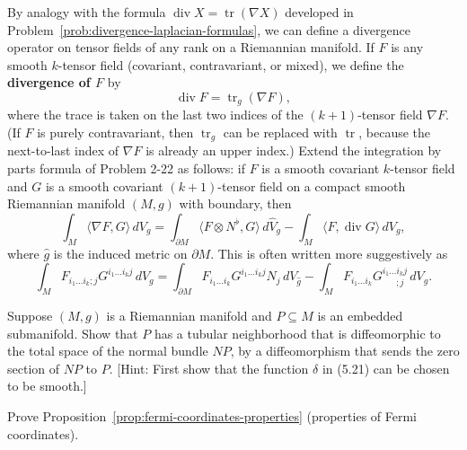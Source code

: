 \begin{exercise}
\label{prob:divergence-tensor-fields}

By analogy with the formula $\operatorname{div} X = \operatorname{tr}(\nabla X)$ developed in Problem~\ref{prob:divergence-laplacian-formulas}, we can define a divergence operator on tensor fields of any rank on a Riemannian manifold. If $F$ is any smooth $k$-tensor field (covariant, contravariant, or mixed), we define the \textbf{divergence of $F$} by
\[
\operatorname{div} F = \operatorname{tr}_g(\nabla F),
\]
where the trace is taken on the last two indices of the $(k+1)$-tensor field $\nabla F$. (If $F$ is purely contravariant, then $\operatorname{tr}_g$ can be replaced with $\operatorname{tr}$, because the next-to-last index of $\nabla F$ is already an upper index.) Extend the integration by parts formula of Problem 2-22 as follows: if $F$ is a smooth covariant $k$-tensor field and $G$ is a smooth covariant $(k+1)$-tensor field on a compact smooth Riemannian manifold $(M,g)$ with boundary, then
\[
\int_M \langle \nabla F, G \rangle \, dV_g = \int_{\partial M} \langle F \otimes N^\flat, G \rangle \, d\hat{V}_g - \int_M \langle F, \operatorname{div} G \rangle \, dV_g,
\]
where $\hat{g}$ is the induced metric on $\partial M$. This is often written more suggestively as
\[
\int_M F_{i_1 \ldots i_k ; j} G^{i_1 \ldots i_k j} \, dV_g = \int_{\partial M} F_{i_1 \ldots i_k} G^{i_1 \ldots i_k j} N_j \, dV_{\hat{g}} - \int_M F_{i_1 \ldots i_k} G^{i_1 \ldots i_k j}_{\ \ \ \ \ \ \ ;j} \, dV_g.
\]
\end{exercise}

\begin{exercise}
\label{prob:tubular-neighborhood-normal-bundle}

Suppose $(M,g)$ is a Riemannian manifold and $P \subseteq M$ is an embedded submanifold. Show that $P$ has a tubular neighborhood that is diffeomorphic to the total space of the normal bundle $NP$, by a diffeomorphism that sends the zero section of $NP$ to $P$. [Hint: First show that the function $\delta$ in (5.21) can be chosen to be smooth.]
\end{exercise}

\begin{exercise}
\label{prob:fermi-coordinates}

Prove Proposition~\ref{prop:fermi-coordinates-properties} (properties of Fermi coordinates).
\end{exercise}

